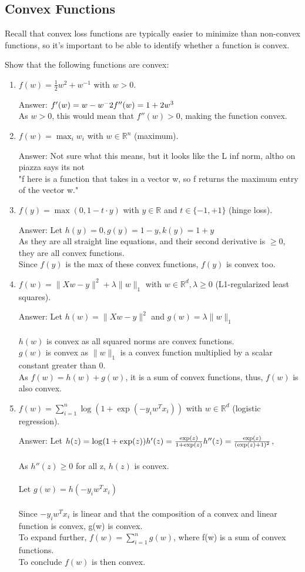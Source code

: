 \documentclass{article}
\def\ans#1{\par\gre{Answer: #1}}
\def\blu#1{{\color{blu}#1}}
\def\gre#1{{\color{gre}#1}}
\def\norm#1{\|#1\|}
\def\R{\mathbb{R}}
\def\half{\frac 1 2}
\def\enum#1{\begin{enumerate}#1\end{enumerate}}
\begin{document}
\pagebreak

\subsection{Convex Functions}

Recall that convex loss functions are typically easier to minimize than non-convex functions, so it's important to be able to identify whether a function is convex.

\blu{Show that the following functions are convex}:

\enum{
\item $f(w) = \half w^2 + w^{-1}$ with $w > 0$.
\ans{$f'(w) = w - w^-2\\
f''(w) = 1 + 2w^3$\\
As $w > 0$, this would mean that $f''(w) > 0$, making the function convex.}
\item $f(w) = \max_i w_i$ with $w \in \R^n$ (maximum).
\ans{Not sure what this means, but it looks like the L inf norm, altho on piazza says its not \\
"f here is a function that takes in a vector w, so f returns the maximum entry of the vector w."}
\item $f(y) = \max(0,1-t\cdot y)$ with $y\in \R$ and $t\in\{-1,+1\}$ (hinge loss).
\ans{Let $h(y) = 0, g(y) = 1 - y, k(y) = 1 + y$ \\
As they are all straight line equations, and their second derivative is $\geq 0$, they are all convex functions.\\
Since $f(y)$ is the max of these convex functions, $f(y)$ is convex too.}
\item $f(w) = \norm{Xw-y}^2 + \lambda\norm{w}_1$ with $w \in \R^d, \lambda \geq 0$ (L1-regularized least squares).
\ans{Let $h(w) = \norm{Xw-y}^2$ and $g(w) = \lambda\norm{w}_1$\\\\
$h(w)$ is convex as all squared norms are convex functions. \\
$g(w)$ is convex as $\norm{w}_1$ is a convex function multiplied by a scalar constant greater than 0. \\
As $f(w) = h(w) + g(w)$, it is a sum of convex functions, thus, $f(w)$ is also convex.}
\item $f(w) = \sum_{i=1}^n \log(1+\exp(-y_iw^Tx_i)) $ with $w \in \R^d$ (logistic regression).
\ans{Let $h(z) = \log(1+\exp(z)) \\
\\
h'(z) = \frac{\exp(z)}{1+\exp(z)} \\
h''(z) = \frac{\exp(z)}{(\exp(z) + 1)^2}$, \\
\\
As $h''(z) \geq 0$ for all z, $h(z)$ is convex. \\
\\
Let $g(w) =  h(-y_i w^T x_i)$ \\
\\
Since $-y_i w^T x_i$ is linear and that the composition of a convex and linear function is convex, g(w) is convex. \\
To expand further, $f(w) = \sum_{i=1}^n g(w)$, where f(w) is a sum of convex functions. \\
To conclude $f(w)$ is then convex.}
}
\end{document}
